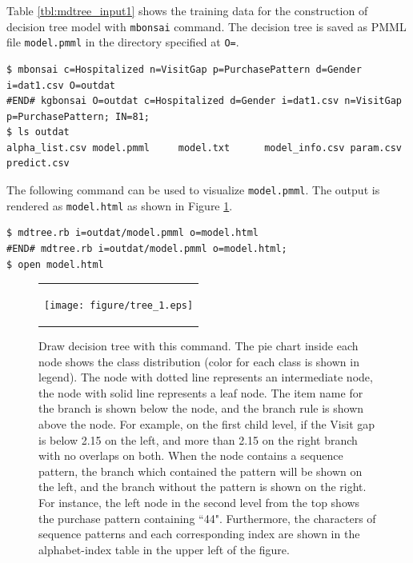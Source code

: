 Table \ref{tbl:mdtree_input1} shows the training data for the construction of decision tree model with \verb|mbonsai| command. 
The decision tree is saved as PMML file \verb|model.pmml| in the directory specified at \verb|O=|. 
 

\begin{Verbatim}[baselinestretch=0.7,frame=single]
$ mbonsai c=Hospitalized n=VisitGap p=PurchasePattern d=Gender i=dat1.csv O=outdat
#END# kgbonsai O=outdat c=Hospitalized d=Gender i=dat1.csv n=VisitGap p=PurchasePattern; IN=81;
$ ls outdat
alpha_list.csv model.pmml     model.txt      model_info.csv param.csv      predict.csv
\end{Verbatim}

The following command can be used to visualize \verb|model.pmml|. 
The output is rendered as  \verb|model.html| as shown in Figure \ref{fig:mdtree_tree_1}. 



\begin{Verbatim}[baselinestretch=0.7,frame=single]
$ mdtree.rb i=outdat/model.pmml o=model.html
#END# mdtree.rb i=outdat/model.pmml o=model.html;
$ open model.html 
\end{Verbatim}

\begin{figure}[htbp]
\begin{center}
\begin{tabular}{c}

\begin{minipage}{0.9\hsize}
\begin{center}
\texttt{[image: figure/tree\_1.eps]}
\caption{Draw decision tree with this command.  
The pie chart inside each node shows the class distribution (color for each class is shown in legend). 
The node with dotted line represents an intermediate node, the node with solid line represents a leaf node. 
The item name for the branch is shown below the node, and the branch rule is shown above the node. 
For example, on the first child level, if the Visit gap is below 2.15 on the left, and more than 2.15 on the right branch with no overlaps on both. 
When the node contains a sequence pattern, the branch which contained the pattern will be shown on the left, and the branch without the pattern is shown on the right. 
For instance, the left node in the second level from the top shows the purchase pattern containing ``44". 
 Furthermore, the characters of sequence patterns and each corresponding index are shown in the alphabet-index table in the upper left of the figure.
\label{fig:mdtree_tree_1}}
\end{center}
\end{minipage}

\end{tabular}
\end{center}
\end{figure}

